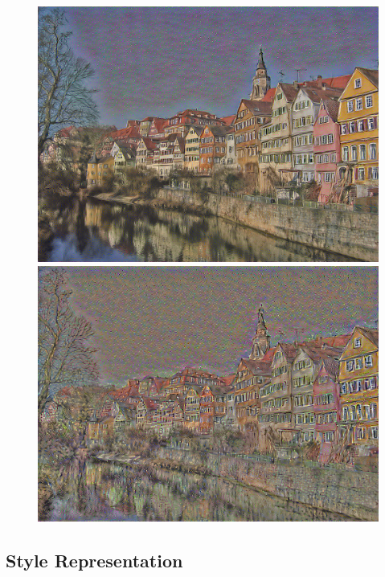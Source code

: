 \documentclass{article}
\begin{document}
\begin{figure}
    \begin{minipage}{0.3\linewidth}
    \includegraphics[width=\textwidth]{img/content/block4_conv1}
    \end{minipage}
    \begin{minipage}{0.3\linewidth}
    \includegraphics[width=\textwidth]{img/content/block5_conv1}
    \end{minipage}

\end{figure}



\subsection{Style Representation}
\end{document}
